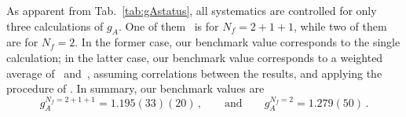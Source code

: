 
As apparent from Tab.~\ref{tab:gAstatus}, all systematics are controlled for
only three calculations of $g_A$.
%
One of them~\cite{Bhattacharya:2016zcn} is for $N_f=2+1+1$, while two of 
them~\cite{Capitani:2017qpc,Bali:2014nma} are for $N_f=2$.
%
In the former case, our benchmark value corresponds to the single calculation;
in the latter case, our benchmark value corresponds to a weighted average 
of~\cite{Capitani:2017qpc} and~\cite{Bali:2014nma}, assuming correlations
between the results, and applying the procedure of \cite{XXX}.
%
In summary, our benchmark values are
\begin{equation}\label{eq:gAcriteria}
g_A^{N_f=2+1+1} = 1.195(33)(20)
\,,\qquad \mathrm{and}\qquad 
g_A^{N_f=2} = 1.279(50)\,.
\end{equation}

%
%

